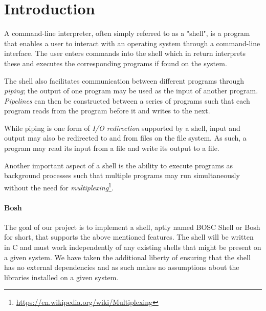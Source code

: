\section{Introduction}
\label{sec:introduction}

A command-line interpreter, often simply referred to as a "shell", is a program that enables a user to interact with an operating system through a command-line interface. The user enters commands into the shell which in return interprets these and executes the corresponding programs if found on the system.

The shell also facilitates communication between different programs through \textit{piping}; the output of one program may be used as the input of another program. \textit{Pipelines} can then be constructed between a series of programs such that each program reads from the program before it and writes to the next.

While piping is one form of \textit{I/O redirection} supported by a shell, input and output may also be redirected to and from files on the file system. As such, a program may read its input from a file and write its output to a file.

Another important aspect of a shell is the ability to execute programs as background processes such that multiple programs may run simultaneously without the need for \textit{multiplexing}\footnote{\url{https://en.wikipedia.org/wiki/Multiplexing}}.

\paragraph{Bosh} The goal of our project is to implement a shell, aptly named BOSC Shell or Bosh for short, that supports the above mentioned features. The shell will be written in C and must work independently of any existing shells that might be present on a given system. We have taken the additional liberty of ensuring that the shell has no external dependencies and as such makes no assumptions about the libraries installed on a given system.
